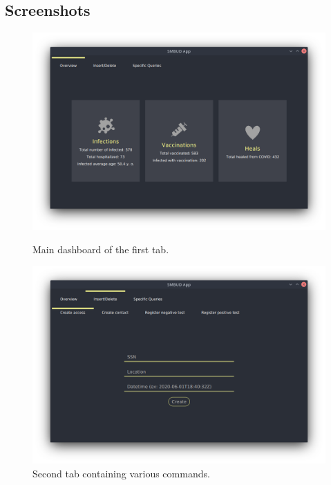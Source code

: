 \documentclass[12pt, a4paper]{article}
\begin{document}
\clearpage %

\subsection{Screenshots}

\setlength\abovecaptionskip{-0.5cm} %

\begin{figure}[h]
        \centering

        \includegraphics[width=.8\linewidth]{app_1.png}
        \caption*{Main dashboard of the first tab.} %

        \includegraphics[width=.8\linewidth]{app_2.png}
        \caption*{Second tab containing various commands.} %
\end{figure}
\end{document}
